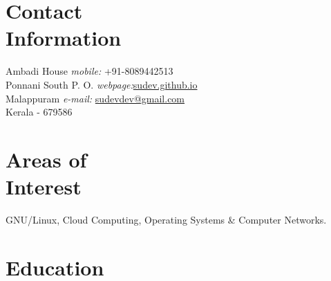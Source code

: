 \documentclass[margin,line]{resume}
\begin{document}
\begin{resume}

    \section{\mysidestyle Contact\\Information}
    
        
    Ambadi House   \hfill \textit{mobile:} \hspace{9mm} 		+91-8089442513 \\ 
    Ponnani South P. O.	\hfill \textit{webpage:}\hspace{14mm}\href{http://sudev.github.io}{sudev.github.io}\\
    Malappuram \hfill 	\textit{e-mail:} \hspace{3.6mm}\href{mailto:sudevdev@gmail.com}{sudevdev@gmail.com}     \\
    Kerala - 679586
			
        \vspace{-2.5mm}%
					
    \section{\mysidestyle Areas of\\Interest}

   GNU/Linux, Cloud Computing, Operating Systems \& Computer Networks.



    \section{\mysidestyle Education}


\end{resume}
\end{document}

